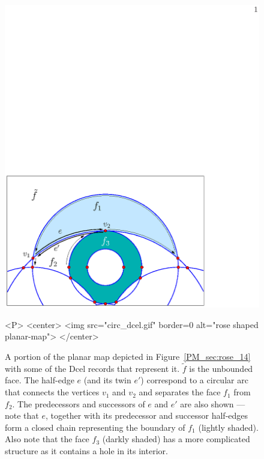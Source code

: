 \begin{figure}[h]
\begin{ccTexOnly}
\centerline{\includegraphics[keepaspectratio]{Planar_map/circ_dcel.eps}}
\end{ccTexOnly}

\caption{A portion of the planar map depicted in Figure~\ref{PM_sec:rose_14} with some of the {\sc Dcel} records that represent it. $\tilde{f}$ is the unbounded face. The half-edge $e$ (and its twin $e'$) correspond to a circular arc that connects the vertices $v_1$ and $v_2$ and separates the face $f_1$ from $f_2$. The predecessors and successors of $e$ and $e'$ are also shown --- note that $e$, together with its predecessor and successor half-edges form a closed chain representing the boundary of $f_1$ (lightly shaded). Also note that the face $f_3$ (darkly shaded) has a more complicated structure as it contains a hole in its interior.}
\label{PM_sec:circ_dcel}

\begin{ccHtmlOnly}
<P>
<center>
  <img src="circ_dcel.gif"  border=0 alt="rose shaped planar-map">
</center>
\end{ccHtmlOnly}
\end{figure}

